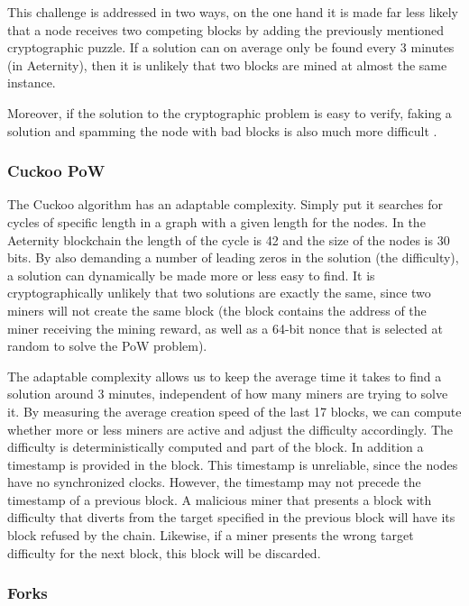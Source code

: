 This challenge is addressed in two ways, on the one hand it is made far
less likely that a node receives two competing blocks by adding the previously
mentioned cryptographic puzzle. If a solution can on average only be found
every 3 minutes (in Aeternity), then it is unlikely that two blocks are
mined at almost the same instance.

Moreover, if the solution to the
cryptographic problem is easy to verify, faking a solution and spamming the
node with bad blocks is also much more difficult
\cite{miningagainstspamming}.

\subsubsection{Cuckoo PoW}

The Cuckoo algorithm has an adaptable complexity. Simply put it
searches for cycles of specific length in a graph with a given length
for the nodes. In the Aeternity blockchain the length of the cycle is 42 and the size
of the nodes is 30 bits. By also demanding a number of
leading zeros in the solution (the difficulty), a solution can dynamically be made
more or less easy to find. It is cryptographically unlikely that two
solutions are exactly the same, since two miners will not create the
same block (the block contains the address of the miner receiving the
mining reward, as well as a 64-bit nonce that is selected at random to
solve the PoW problem).

The adaptable complexity allows us to keep the average time it takes
to find a solution around 3 minutes, independent of how many miners
are trying to solve it. By measuring the average creation speed of the
last 17 blocks, we can compute whether more or less miners are active and adjust
the difficulty accordingly. The difficulty is deterministically
computed and part of the block. In addition a timestamp is provided in
the block. This timestamp is unreliable, since the nodes have no
synchronized clocks. However, the timestamp may not precede the
timestamp of a previous block. A malicious miner that presents a
block with difficulty that diverts from the target specified in the
previous block will have its block refused by the chain. Likewise, if
a miner presents the wrong target difficulty for the next block, this
block will be discarded.

\subsubsection{Forks}

